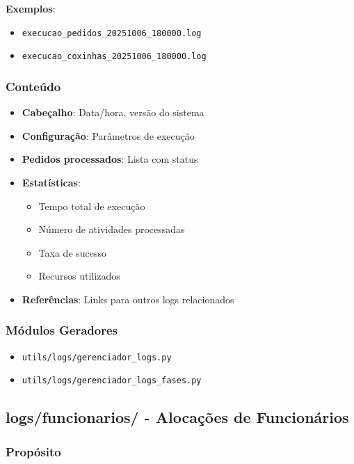 \documentclass[11pt,a4paper]{article}
\begin{document}
\textbf{Exemplos}:
\begin{itemize}
    \item \texttt{execucao\_pedidos\_20251006\_180000.log}
    \item \texttt{execucao\_coxinhas\_20251006\_180000.log}
\end{itemize}

\subsubsection{Conteúdo}

\begin{itemize}[leftmargin=2cm]
    \item \textbf{Cabeçalho}: Data/hora, versão do sistema
    \item \textbf{Configuração}: Parâmetros de execução
    \item \textbf{Pedidos processados}: Lista com status
    \item \textbf{Estatísticas}:
    \begin{itemize}
        \item Tempo total de execução
        \item Número de atividades processadas
        \item Taxa de sucesso
        \item Recursos utilizados
    \end{itemize}
    \item \textbf{Referências}: Links para outros logs relacionados
\end{itemize}

\subsubsection{Módulos Geradores}

\begin{itemize}
    \item \texttt{utils/logs/gerenciador\_logs.py}
    \item \texttt{utils/logs/gerenciador\_logs\_fases.py}
\end{itemize}

\subsection{logs/funcionarios/ - Alocações de Funcionários}

\subsubsection{Propósito}
\end{document}
